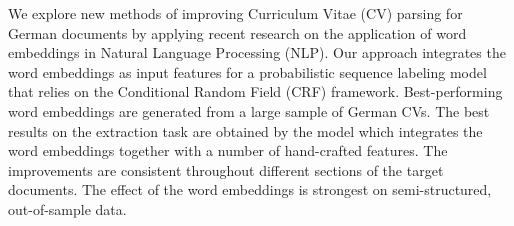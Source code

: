 We explore new methods of improving Curriculum Vitae (CV) parsing for German documents by applying recent research on the application of word embeddings in Natural Language Processing (NLP). Our approach integrates the word embeddings as input features for a probabilistic sequence labeling model that relies on the Conditional Random Field (CRF) framework. Best-performing word embeddings are generated from a large sample of German CVs. The best results on the extraction task are obtained by the model which integrates the word embeddings together with a number of hand-crafted features. The improvements are consistent throughout different sections of the target documents. The effect of the word embeddings is strongest on semi-structured, out-of-sample data.
